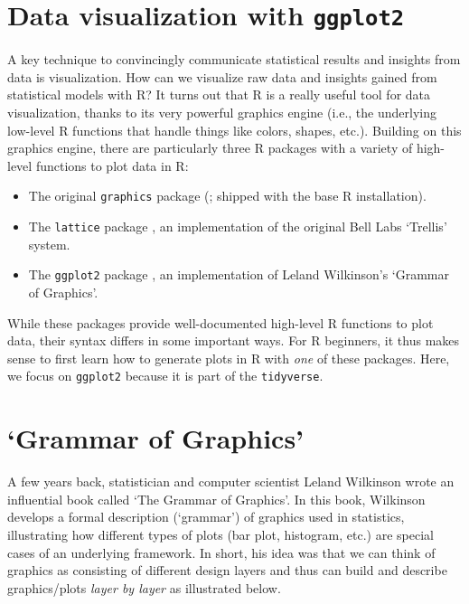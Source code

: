 \documentclass[
  12pt,
]{style/krantz}
\providecommand{\tightlist}{%
  \setlength{\itemsep}{0pt}\setlength{\parskip}{0pt}}
\begin{document}
\hypertarget{data-visualization-with-ggplot2}{%
\section{\texorpdfstring{Data visualization with \texttt{ggplot2}}{Data visualization with ggplot2}}\label{data-visualization-with-ggplot2}}

A key technique to convincingly communicate statistical results and insights from data is visualization. How can we visualize raw data and insights gained from statistical models with R? It turns out that R is a really useful tool for data visualization, thanks to its very powerful graphics engine (i.e., the underlying low-level R functions that handle things like colors, shapes, etc.). Building on this graphics engine, there are particularly three R packages with a variety of high-level functions to plot data in R:

\begin{itemize}
\tightlist
\item
  The original \texttt{graphics} package (\citet{r_2018}; shipped with the base R installation).
\item
  The \texttt{lattice} package \citep{lattice_2008}, an implementation of the original Bell Labs `Trellis' system.
\item
  The \texttt{ggplot2} package \citep{wickham_2016}, an implementation of Leland Wilkinson's `Grammar of Graphics'.
\end{itemize}

While these packages provide well-documented high-level R functions to plot data, their syntax differs in some important ways. For R beginners, it thus makes sense to first learn how to generate plots in R with \emph{one} of these packages. Here, we focus on \texttt{ggplot2} because it is part of the \texttt{tidyverse}.

\hypertarget{grammar-of-graphics}{%
\section{`Grammar of Graphics'}\label{grammar-of-graphics}}

A few years back, statistician and computer scientist Leland Wilkinson wrote an influential book called `The Grammar of Graphics'. In this book, Wilkinson develops a formal description (`grammar') of graphics used in statistics, illustrating how different types of plots (bar plot, histogram, etc.) are special cases of an underlying framework. In short, his idea was that we can think of graphics as consisting of different design layers and thus can build and describe graphics/plots \emph{layer by layer} as illustrated below.
\end{document}
